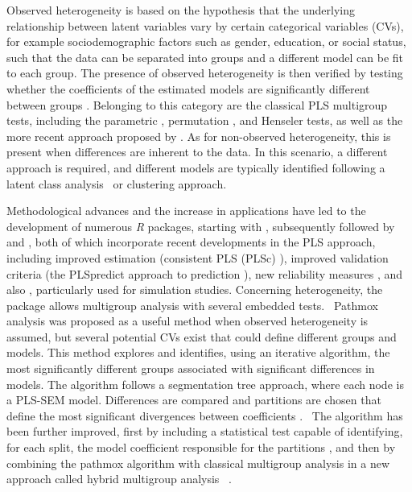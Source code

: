 Observed heterogeneity is based on the hypothesis that the underlying relationship between latent variables vary by certain categorical variables (CVs), for example sociodemographic factors such as gender, education, or social status, such that the data can be separated into groups and a different model can be fit to each group. The presence of observed heterogeneity is then verified by testing whether the coefficients of the estimated models are significantly different between groups \citep{Hair17}. Belonging to this category are the classical PLS multigroup tests, including the parametric \citep{Keil00}, permutation \citep{Chin10}, and Henseler \citep{Henseler09} tests, as well as the more recent approach proposed by \citet{Klesel19}. As for non-observed heterogeneity, this is present when differences are inherent to the data. In this scenario, a different approach is required, and different models are typically identified following a latent class analysis \citep{Sarstedt22c} or clustering \citep{Vinzi08} approach.

Methodological advances and the increase in applications have led to the development of numerous  \emph{R} packages, starting with   \citep{plspm}, subsequently followed by   \citep{csem} and   \citep{seminr}, both of which incorporate recent developments in the PLS approach, including improved estimation (consistent PLS  (PLSc) \citealp{Dijkstra15}), improved validation criteria  (the PLSpredict approach to prediction \citealp{Shmueli16,Shmueli19}),  new reliability measures \citep{Dijkstra15, Hair19}, and also  \citep{matpls}, particularly used for simulation studies. Concerning heterogeneity,  the  package allows multigroup analysis with several embedded tests. 
Pathmox analysis \citep{Sanchez06, Lamberti16, Lamberti17}  was proposed as a useful method when observed heterogeneity is assumed, but several potential CVs exist that could define different groups and models. This method explores and identifies, using an iterative algorithm, the most significantly different groups associated with significant differences in models. The algorithm follows a segmentation tree approach, where each node is a PLS-SEM model. Differences are compared and partitions are chosen that define the most significant divergences between coefficients \citep{Lamberti16}.  The algorithm has been further improved, first by including a statistical test capable of identifying, for each split, the model coefficient responsible for the partitions \citep{Lamberti17}, and then by combining the pathmox algorithm with classical multigroup analysis in a new approach called hybrid multigroup analysis  \citep{Lamberti21}. 


